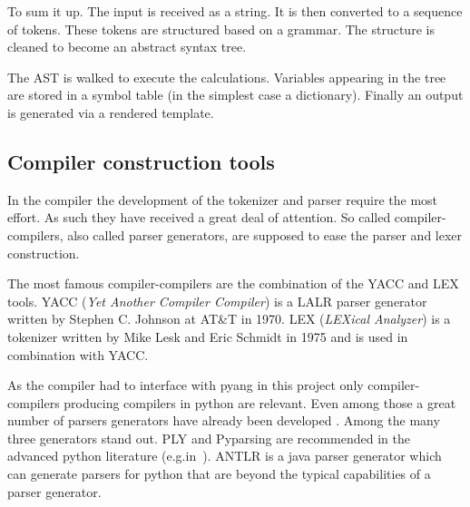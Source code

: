 \documentclass{scrartcl}
\begin{document}
To sum it up. The input is received as a string. It is then converted to a
sequence of tokens. These tokens are structured based on a grammar. The
structure is cleaned to become an abstract syntax tree.

The AST is walked to execute the calculations. Variables appearing in the tree
are stored in a symbol table (in the simplest case a dictionary). Finally an
output is generated via a rendered template.

\subsection{Compiler construction tools}
\label{sub:compiler_construction_tools}
In the compiler the development of the tokenizer and parser require the most
effort. As such they have received a great deal of attention. So called
compiler-compilers, also called parser generators, are supposed to ease the
parser and lexer construction.

The most famous compiler-compilers are the combination of the YACC and LEX
tools. YACC (\emph{Yet Another Compiler Compiler}) is a LALR parser generator
written by Stephen C. Johnson at AT\&T in 1970. LEX (\emph{LEXical Analyzer}) is
a tokenizer written by Mike Lesk and Eric Schmidt in 1975 and is used in
combination with YACC.

As the compiler had to interface with pyang in this project
only compiler-compilers producing
compilers in python are relevant. Even among those a great number of parsers
generators have already been developed \cite{website:pyparser}. Among the many
three generators stand out.  PLY and Pyparsing are recommended in the advanced
python literature (e.g.\@ in~\cite{Beazley2013python}). ANTLR is a java parser
generator which can generate parsers for python that are beyond the typical
capabilities of a parser generator.
\end{document}
